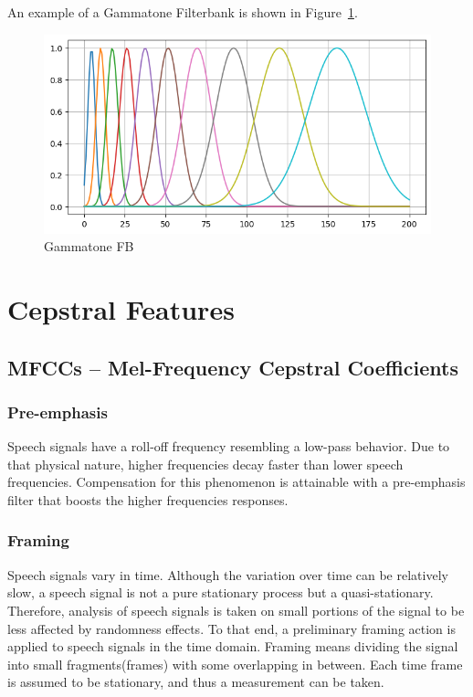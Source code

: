 An example of a Gammatone Filterbank
is shown in Figure~\ref{fig:sb_fb_gauss}.
\begin{figure}[H]
    \centering
    \includegraphics[width=0.75\linewidth]{Features/images/sb_fb_gauss}
    \caption{Gammatone FB}\label{fig:sb_fb_gauss}
\end{figure}


\section{Cepstral Features}
\subsection{MFCCs -- Mel-Frequency Cepstral Coefficients}

\subsubsection{Pre-emphasis}
Speech signals have a roll-off frequency 
resembling a low-pass behavior\cite{237532}.
Due to that physical nature, higher frequencies 
decay faster than lower speech frequencies.
Compensation for this phenomenon is attainable with a 
pre-emphasis filter that boosts 
the higher\cite{7489370} frequencies responses.


\subsubsection{Framing}
Speech signals vary in time. 
Although the variation over time can be relatively slow, 
a speech signal is not a pure stationary process 
but a quasi-stationary. 
Therefore, analysis of speech signals 
is taken on small portions of the 
signal to be less affected by randomness effects.
To that end, a preliminary framing action is applied
to speech signals in the time domain.
Framing means dividing the signal 
into small fragments(frames) with some overlapping in between.
Each time frame is assumed to be stationary,
and thus a measurement can be taken.

